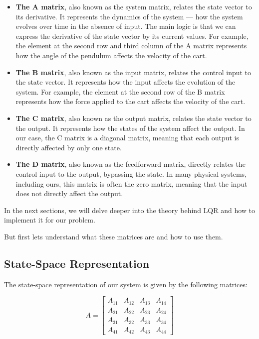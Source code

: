 \documentclass[11pt,twocolumn,twoside,lineno]{pnas-new}
\begin{document}
\begin{itemize}
    \item \textbf{The A matrix}, also known as the system matrix, relates the state vector to its derivative. It represents the dynamics of the system — how the system evolves over time in the absence of input. The main logic is that we can express the derivative of the state vector by its current values. For example, the element at the second row and third column of the A matrix represents how the angle of the pendulum affects the velocity of the cart.
    \item \textbf{The B matrix}, also known as the input matrix, relates the control input to the state vector. It represents how the input affects the evolution of the system. For example, the element at the second row of the B matrix represents how the force applied to the cart affects the velocity of the cart.
    \item \textbf{The C matrix}, also known as the output matrix, relates the state vector to the output. It represents how the states of the system affect the output. In our case, the C matrix is a diagonal matrix, meaning that each output is directly affected by only one state.
    \item \textbf{The D matrix}, also known as the feedforward matrix, directly relates the control input to the output, bypassing the state. In many physical systems, including ours, this matrix is often the zero matrix, meaning that the input does not directly affect the output.
\end{itemize}

In the next sections, we will delve deeper into the theory behind LQR and how to implement it for our problem.

But first lets understand what these matrices are and how to use them.

\subsection{State-Space Representation}
The state-space representation of our system is given by the following matrices:

\begin{equation}
A = \begin{bmatrix}
A_{11} & A_{12} & A_{13} & A_{14} \\
A_{21} & A_{22} & A_{23} & A_{24} \\
A_{31} & A_{32} & A_{33} & A_{34} \\
A_{41} & A_{42} & A_{43} & A_{44}
\end{bmatrix}
\end{equation}
\end{document}
